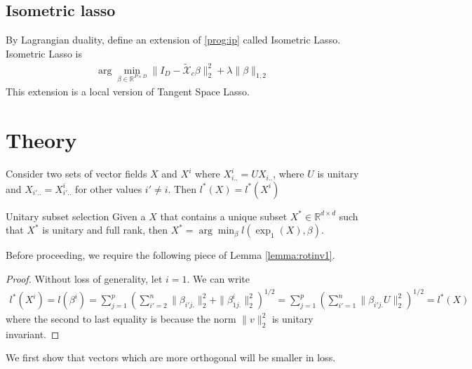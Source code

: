 \documentclass[a4paper,11pt]{article}
\begin{document}
\subsection{Isometric lasso}

By Lagrangian duality, define an extension of \ref{prog:ip} called Isometric Lasso.
Isometric Lasso is
\begin{align}
\arg \min_{\beta \in \mathbb R^{P \times D}} \|I_D -  \tilde{ \mathcal X}_c \beta\|_2^2 +  \lambda \| \beta \|_{1,2}
\end{align}
This extension is a local version of Tangent Space Lasso.

\section{Theory}

 \begin{proposition}
 \label{prop:unitarybasis}
Consider two sets of vector fields $X$ and $X^i$ where $X_{i..}^i = U X_{i..} $, where $U$ is unitary and $X_{i'..} = X_{i'..}^i$ for other values $i' \neq i$.
Then $l^*(X) = l^*(X^i)$
\end{proposition}

\begin{proposition}{Unitary subset selection}
Given a $X$ that contains a unique subset $X^* \in \mathbb R^{d \times d} $ such that $X^*$ is unitary and full rank, then $X^* = \arg \min_\beta l(\exp_1(X),\beta)$.
\end{proposition}


Before proceeding, we require the following piece of Lemma \ref{lemma:rotinv1}. 


\begin{proof}
Without loss of generality, let $i = 1$.
We can write 
\begin{eqnarray}
l^*(X^i) = l(\beta^i) = \sum_{j = 1}^p (\sum_{i'=2}^n \| \beta_{i'j.} \|_2^2 +  \|  \beta_{1j.}^i \|_2^2 )^{1/2}=  \sum_{j = 1}^p (\sum_{i'=1}^n \| \beta_{i'j.} U \|_2^2)^{1/2} = l^*(X)
\end{eqnarray}
where the second to last equality is because the norm $\|v\|_2^2 $ is unitary invariant.
\end{proof}

We first show that vectors which are more orthogonal will be smaller in loss.
\end{document}
